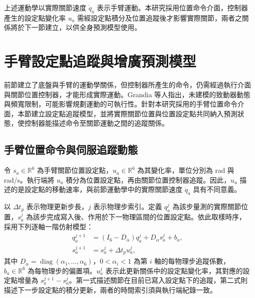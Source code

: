 上述運動學以實際關節速度 $\dot{q}_a$ 表示手臂運動。本研究採用位置命令介面，控制器產生的設定點變化率 $u_a$ 需經設定點積分及位置追蹤後才影響實際關節，兩者之關係將於下一節建立，以供全身預測模型使用。



\section{手臂設定點追蹤與增廣預測模型}
\label{sec:arm_augmented_prediction}

前節建立了底盤與手臂的運動學關係，但控制器所產生的命令，仍需經過執行介面與關節位置控制器，才能形成實際運動。Grandia 等人\cite{grandia2019frequency}指出，未建模的致動器動態與頻寬限制，可能影響規劃運動的可執行性。針對本研究採用的手臂位置命令介面，本節建立設定點追蹤模型，並將實際關節位置與位置設定點共同納入預測狀態，使控制器能描述命令至關節運動之間的追蹤關係。

\subsection{手臂位置命令與伺服追蹤動態}
\label{subsec:arm_setpoint_servo}

令 $s_a\in\mathbb{R}^{6}$ 為手臂關節位置設定點，$u_a\in\mathbb{R}^{6}$ 為其變化率，單位分別為 rad 與 rad/s。執行端將 $u_a$ 積分為位置設定點，再由關節位置控制器追蹤。因此，$u_a$ 描述的是設定點的移動速率，與前節運動學中的實際關節速度 $\dot{q}_a$ 具有不同意義。

以 $\Delta t_p$ 表示物理更新步長，$j$ 表示物理步索引。定義 $q_a^{j}$ 為該步量測的實際關節位置，$s_a^{j}$ 為該步完成寫入後、作用於下一物理區間的位置設定點。依此取樣時序，採用下列逐軸一階仿射模型：
\begin{equation}
    \begin{aligned}
        q_a^{j+1}
        &= (I_6-D_{\alpha})q_a^{j}
           +D_{\alpha}s_a^{j}+b_a, \\
        s_a^{j+1}
        &= s_a^{j}+\Delta t_p u_a^{j},
    \end{aligned}
    \label{eq:ch3_physics_step_arm_model}
\end{equation}
其中 $D_{\alpha}=\operatorname{diag}(\alpha_1,\ldots,\alpha_6)$，$0<\alpha_i<1$ 為第 $i$ 軸的每物理步追蹤係數，$b_a\in\mathbb{R}^{6}$ 為每物理步的偏置項。$u_a^{j}$ 表示此更新關係中的設定點變化率，其對應的設定點增量為 $s_a^{j+1}-s_a^{j}$。第一式描述關節在目前已寫入設定點下的追蹤，第二式則描述下一步設定點的積分更新，兩者的時間索引須與執行端紀錄一致。

